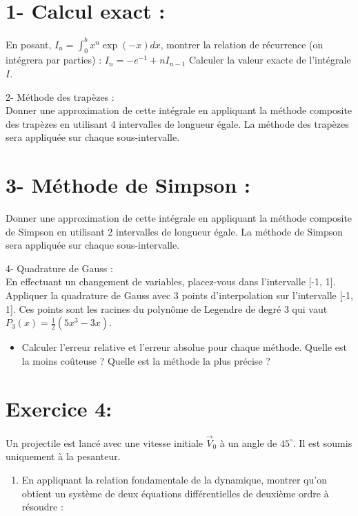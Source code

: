 \documentclass[10pt]{article}
\begin{document}
\section*{1- Calcul exact :}
En posant, \(I_{n}=\int_{0}^{b} x^{n} \exp (-x) d x\), montrer la relation de récurrence (on intégrera par parties) : \(I_{n}=-e^{-1}+n I_{n-1}\) Calculer la valeur exacte de l'intégrale \(I\).

2- Méthode des trapèzes :\\
Donner une approximation de cette intégrale en appliquant la méthode composite des trapèzes en utilisant 4 intervalles de longueur égale. La méthode des trapèzes sera appliquée sur chaque sous-intervalle.

\section*{3- Méthode de Simpson :}
Donner une approximation de cette intégrale en appliquant la méthode composite de Simpson en utilisant 2 intervalles de longueur égale. La méthode de Simpson sera appliquée sur chaque sous-intervalle.

4- Quadrature de Gauss :\\[0pt]
En effectuant un changement de variables, placez-vous dans l'intervalle [-1, 1]. Appliquer la quadrature de Gauss avec 3 points d'interpolation sur l'intervalle [-1, 1]. Ces points sont les racines du polynôme de Legendre de degré 3 qui vaut \(P_{3}(x)=\frac{1}{2}\left(5 x^{3}-3 x\right)\).

\begin{itemize}
  \item Calculer l'erreur relative et l'erreur absolue pour chaque méthode. Quelle est la moins coûteuse ? Quelle est la méthode la plus précise ?
\end{itemize}

\section*{Exercice 4:}
Un projectile est lancé avec une vitesse initiale \(\vec{V}_{0}\) à un angle de \(45^{\circ}\). Il est soumis uniquement à la pesanteur.

\begin{enumerate}
  \item En appliquant la relation fondamentale de la dynamique, montrer qu'on obtient un système de deux équations différentielles de deuxième ordre à résoudre :
\end{enumerate}
\end{document}
